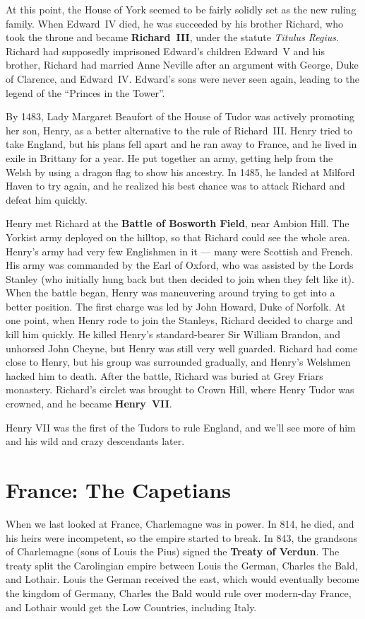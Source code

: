 At this point, the House of York seemed to be fairly solidly set as the new ruling family.
When Edward~IV died, he was succeeded by his brother Richard,
who took the throne and became \textbf{Richard~III}, under the statute \textit{Titulus Regius}.
Richard had supposedly imprisoned Edward's children Edward~V and his brother,
Richard had married Anne Neville after an argument with George, Duke of Clarence, and Edward~IV\@.
Edward's sons were never seen again,
leading to the legend of the ``Princes in the Tower''.

By 1483, Lady Margaret Beaufort of the House of Tudor was actively promoting her son, Henry,
as a better alternative to the rule of Richard~III\@.
Henry tried to take England, but his plans fell apart and he ran away to France,
and he lived in exile in Brittany for a year.
He put together an army, getting help from the Welsh by using a dragon flag to show his ancestry.
In 1485, he landed at Milford Haven to try again,
and he realized his best chance was to attack Richard and defeat him quickly.

Henry met Richard at the \textbf{Battle of Bosworth Field}, near Ambion Hill.
The Yorkist army deployed on the hilltop, so that Richard could see the whole area.
Henry's army had very few Englishmen in it --- many were Scottish and French.
His army was commanded by the Earl of Oxford, who was assisted by the Lords Stanley
(who initially hung back but then decided to join when they felt like it).
When the battle began, Henry was maneuvering around trying to get into a better position.
The first charge was led by John Howard, Duke of Norfolk.
At one point, when Henry rode to join the Stanleys, Richard decided to charge and kill him quickly.
He killed Henry's standard-bearer Sir William Brandon, and unhorsed John Cheyne,
but Henry was still very well guarded.
Richard had come close to Henry, but his group was surrounded gradually,
and Henry's Welshmen hacked him to death.
After the battle, Richard was buried at Grey Friars monastery.
Richard's circlet was brought to Crown Hill,
where Henry Tudor was crowned, and he became \textbf{Henry~VII}\@.

Henry VII was the first of the Tudors to rule England,
and we'll see more of him and his wild and crazy descendants later.

\section{France: The Capetians}

When we last looked at France, Charlemagne was in power.
In 814, he died, and his heirs were incompetent, so the empire started to break.
In 843, the grandsons of Charlemagne (sons of Louis the Pius) signed the \textbf{Treaty of Verdun}.
The treaty split the Carolingian empire between Louis the German, Charles the Bald, and Lothair.
Louis the German received the east, which would eventually become the kingdom of Germany,
Charles the Bald would rule over modern-day France,
and Lothair would get the Low Countries, including Italy.

